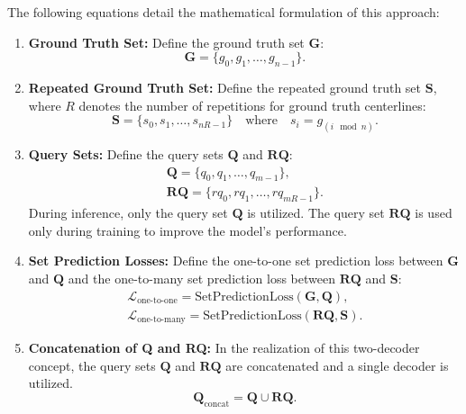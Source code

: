 The following equations detail the mathematical formulation of this approach:
\begin{enumerate}
    \item \textbf{Ground Truth Set:} Define the ground truth set $\mathbf{G}$:
    \begin{equation}
        \mathbf{G} = \{g_0, g_1, \ldots, g_{n-1}\}.
    \end{equation}
    \item \textbf{Repeated Ground Truth Set:} Define the repeated ground truth set $\mathbf{S}$, where $R$ denotes the number of repetitions for ground truth centerlines:
    \begin{equation}
        \mathbf{S} = \{s_0, s_1, \ldots, s_{nR-1}\} \quad \text{where} \quad s_i = g_{(i \mod n)}.
    \end{equation}
    \item \textbf{Query Sets:} Define the query sets $\mathbf{Q}$ and $\mathbf{RQ}$:
    \begin{equation}
        \begin{aligned}
        \mathbf{Q} = \{q_0, q_1, \ldots, q_{m-1}\}, \\
        \mathbf{RQ} = \{rq_0, rq_1, \ldots, rq_{mR-1}\}.
        \end{aligned}
    \end{equation}
    During inference, only the query set $\mathbf{Q}$ is utilized. The query set $\mathbf{RQ}$ is used only during training to improve the model's performance.
    \item \textbf{Set Prediction Losses:} Define the one-to-one set prediction loss between $\mathbf{G}$ and $\mathbf{Q}$ and the one-to-many set prediction loss between $\mathbf{RQ}$ and $\mathbf{S}$:
    \begin{equation}
        \begin{aligned}
    \mathcal{L}_{\text{one-to-one}} = \text{SetPredictionLoss}(\mathbf{G}, \mathbf{Q}), \\
    \mathcal{L}_{\text{one-to-many}} = \text{SetPredictionLoss}(\mathbf{RQ}, \mathbf{S}).
        \end{aligned}
    \end{equation}
    \item \textbf{Concatenation of Q and RQ:} In the realization of this two-decoder concept, the query sets $\mathbf{Q}$ and $\mathbf{RQ}$ are concatenated and a single decoder is utilized. 
    \begin{equation}
        \mathbf{Q}_{\text{concat}} = \mathbf{Q} \cup \mathbf{RQ}.

\end{equation}
\end{enumerate}
